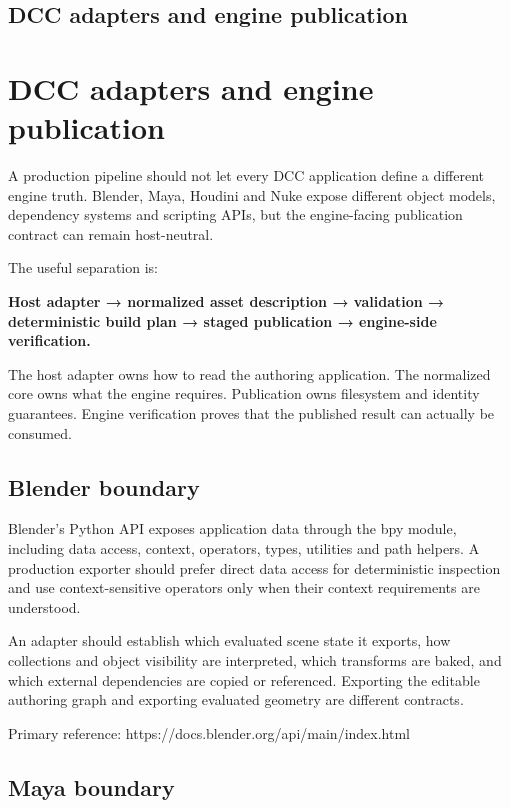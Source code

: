 \hypertarget{appendix-03ade9e1875f}{}
\section*{DCC adapters and engine publication}
\chapter{DCC adapters and engine publication}\label{appendix-03ade9e1875f-dcc-adapters-and-engine-publication}

A production pipeline should not let every DCC application define a different engine truth. Blender, Maya, Houdini and Nuke expose different object models, dependency systems and scripting APIs, but the engine-facing publication contract can remain host-neutral.

The useful separation is:

\textbf{Host adapter → normalized asset description → validation → deterministic build plan → staged publication → engine-side verification.}

The host adapter owns how to read the authoring application. The normalized core owns what the engine requires. Publication owns filesystem and identity guarantees. Engine verification proves that the published result can actually be consumed.

\section{Blender boundary}\label{appendix-03ade9e1875f-blender-boundary}

Blender's Python API exposes application data through the bpy module, including data access, context, operators, types, utilities and path helpers. A production exporter should prefer direct data access for deterministic inspection and use context-sensitive operators only when their context requirements are understood.

An adapter should establish which evaluated scene state it exports, how collections and object visibility are interpreted, which transforms are baked, and which external dependencies are copied or referenced. Exporting the editable authoring graph and exporting evaluated geometry are different contracts.

Primary reference: https://docs.blender.org/api/main/index.html

\section{Maya boundary}\label{appendix-03ade9e1875f-maya-boundary}

